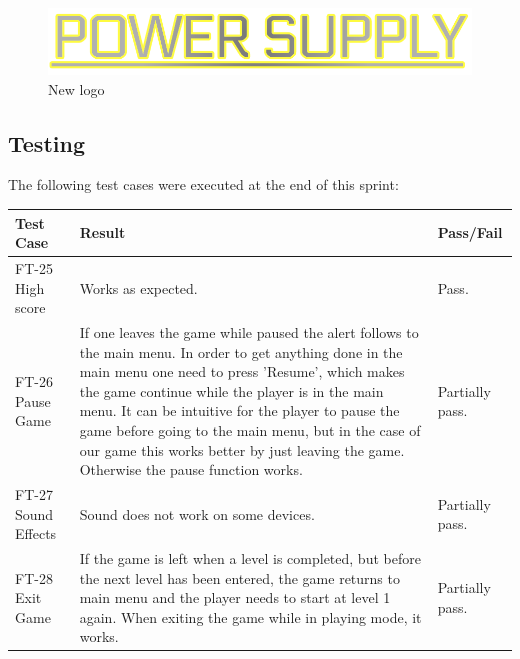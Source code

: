 		\begin{figure}
			\centering
			\includegraphics[scale=0.4]{pictures/newLogo.png}
			\caption{New logo}
		\end{figure}


\subsection{Testing}

	The following test cases were executed at the end of this sprint:


	\begin{tabular}{| p{3cm} | p{7cm} | p{2cm} |}
		\hline
		\rowcolor{lightgray}
		{\bf Test Case} & {\bf Result} & {\bf Pass/Fail} \\ \hline

		FT-25 High score & Works as expected. & Pass. \\ \hline

		FT-26 Pause Game & If one leaves the game while paused the alert follows to the main menu. In order 
		to get anything done in the main menu one need to press 'Resume', which makes the game continue while 
		the player is in the main menu. It can be intuitive for the player to pause the game before going to 
		the main menu, but in the case of our game this works better by just leaving the game. Otherwise the 
		pause function works. & Partially pass. \\ \hline

		FT-27 Sound Effects & Sound does not work on some devices. & Partially pass. \\ \hline

		FT-28 Exit Game & If the game is left when a level is completed, but before the next level has been 
		entered, the game returns to main menu and the player needs to start at level 1 again. When exiting 
		the game while in playing mode, it works. & Partially pass. \\ \hline



	\end{tabular}

